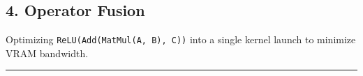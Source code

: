 \hypertarget{operator-fusion}{%
\subsection{4. Operator Fusion}\label{operator-fusion}}

Optimizing \passthrough{\lstinline!ReLU(Add(MatMul(A, B), C))!} into a
single kernel launch to minimize VRAM bandwidth.

\begin{center}\rule{0.5\linewidth}{0.5pt}\end{center}
